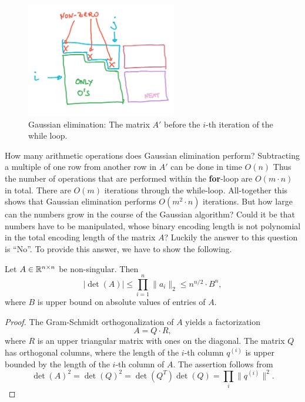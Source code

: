 \begin{figure}  
   \centering
  \includegraphics[height=5cm]{figures/Echelon.jpg}
  \caption{Gaussian elimination: The matrix $A'$ before  the $i$-th iteration of the while loop. \label{fig:9}}
\end{figure}


How many arithmetic operations does Gaussian elimination perform? Subtracting a multiple of one row from another row in $A'$ can be done in time $O(n)$ Thus the number of operations that are performed within the {\bf for}-loop are $O(m ⋅n)$ in total. There are $O(m)$ iterations through the while-loop. All-together this shows that Gaussian elimination performs $O(m^2 ⋅n)$ iterations. But how large can the numbers grow in the course of the Gaussian algorithm? Could it be that numbers have to be manipulated, whose binary encoding length is not polynomial in the total encoding length of the matrix $A$? Luckily the answer to this question is ``No''. To provide this answer, we have to show the following. 


\begin{theorem} 
  Let $A \in \mathbb{R}^{n \times n}$ be non-singular. Then 
  \begin{displaymath}
    |\det(A)| \leq \prod_{i=1}^n \|a_i\|_2 \leq n^{n/2} \cdot B^n, 
  \end{displaymath}
  where $B$ is upper bound on absolute values of entries of $A$.
\end{theorem}

\begin{proof}
  The Gram-Schmidt orthogonalization of $A$ yields a factorization 
  \begin{displaymath}
    A = Q \cdot R,
  \end{displaymath}
where $R$ is an upper triangular matrix with ones on the diagonal. The matrix $Q$ has orthogonal columns, where the length of the $i$-th column $q^{(i)}$ is upper bounded by the length of the $i$-th column of $A$. 
The assertion follows from 
\begin{displaymath}
  \det(A)^2 = \det(Q)^2 = \det(Q^T) \det(Q) = \prod_i \|q^{(i)}\|^2. 
\end{displaymath}
\end{proof}



